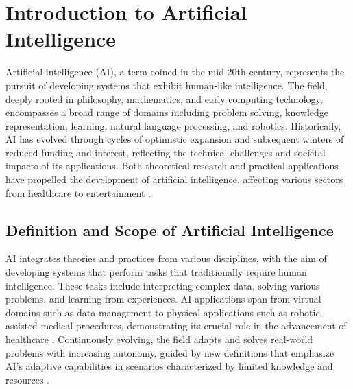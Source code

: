 \section{Introduction to Artificial Intelligence}
\label{sec:ai_history_overview}
Artificial intelligence (AI), a term coined in the mid-20th century, represents the pursuit of developing systems that exhibit human-like intelligence. The field, deeply rooted in philosophy, mathematics, and early computing technology, encompasses a broad range of domains including problem solving, knowledge representation, learning, natural language processing, and robotics. Historically, AI has evolved through cycles of optimistic expansion and subsequent winters of reduced funding and interest, reflecting the technical challenges and societal impacts of its applications. Both theoretical research and practical applications have propelled the development of artificial intelligence, affecting various sectors from healthcare to entertainment \cite{buchanan2005history, marquis2020elements, muthukrishnan2020history}.

\subsection{Definition and Scope of Artificial Intelligence}
AI integrates theories and practices from various disciplines, with the aim of developing systems that perform tasks that traditionally require human intelligence. These tasks include interpreting complex data, solving various problems, and learning from experiences. AI applications span from virtual domains such as data management to physical applications such as robotic-assisted medical procedures, demonstrating its crucial role in the advancement of healthcare \cite{tecuci2012artificial, hamet2017artificial}. Continuously evolving, the field adapts and solves real-world problems with increasing autonomy, guided by new definitions that emphasize AI's adaptive capabilities in scenarios characterized by limited knowledge and resources \cite{wang2019defining}.

